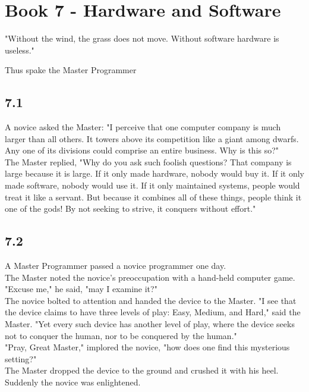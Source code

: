 \documentclass[14pt, letterpaper]{book}
\begin{document}
\chapter*{Book 7 - Hardware and Software}
\epigraph{"Without the wind, the grass does not move. Without software hardware is useless."}{Thus spake the Master Programmer}

\section*{7.1}
A novice asked the Master: "I perceive that one computer company is much larger than all others. It towers above its competition like a giant among dwarfs. Any one of its divisions could comprise an entire business. Why is this so?"\\

The Master replied, "Why do you ask such foolish questions? That company is large because it is large. If it only made hardware, nobody would buy it. If it only made software, nobody would use it. If it only maintained systems, people would treat it like a servant. But because it combines all of these things, people think it one of the gods! By not seeking to strive, it conquers without effort."

\section*{7.2}
A Master Programmer passed a novice programmer one day.\\

The Master noted the novice's preoccupation with a hand-held computer game.\\

"Excuse me," he said, "may I examine it?"\\

The novice bolted to attention and handed the device to the Master. "I see that the device claims to have three levels of play: Easy, Medium, and Hard," said the Master. "Yet every such device has another level of play, where the device seeks not to conquer the human, nor to be conquered by the human."\\

"Pray, Great Master," implored the novice, "how does one find this mysterious setting?"\\

The Master dropped the device to the ground and crushed it with his heel. Suddenly the novice was enlightened.
\end{document}
